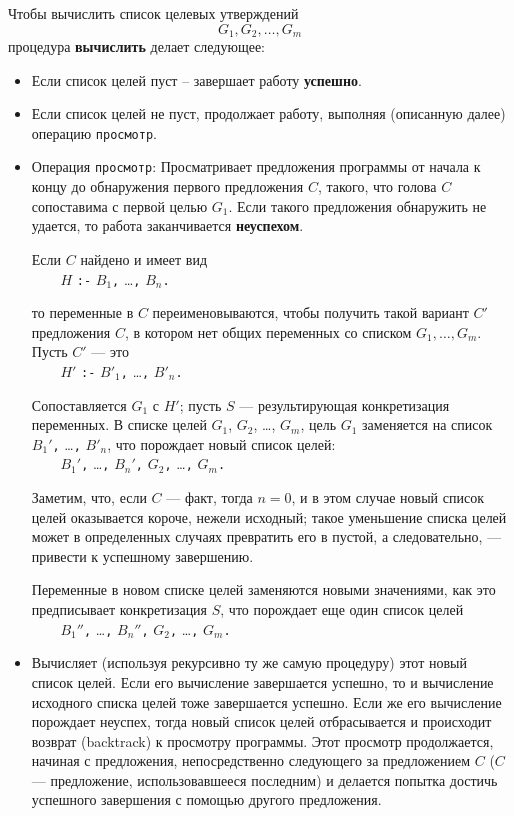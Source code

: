 \documentclass[12pt, openany, twoside]{book} %
\begin{document}
Чтобы вычислить список целевых утверждений
$$
    G_1, G_2, \ldots, G_m
$$
процедура \textbf{вычислить} делает следующее:
\begin{itemize}
  \item Если список целей пуст -- завершает работу \textbf{успешно}.
  \item Если список целей не пуст, продолжает работу, выполняя (описанную далее) операцию {\tt просмотр}.
  \item Операция \texttt{просмотр}: Просматривает предложения программы от начала к концу до обнаружения первого предложения $C$, такого, что голова $C$ сопоставима с первой целью $G_1$. Если такого предложения обнаружить не удается, то работа заканчивается \textbf{неуспехом}.

\noindent Если $C$ найдено и имеет вид\\[1ex]
\verb|    |$H$ {\tt :-} $B_1${\tt,} \ldots{\tt,} $B_n${\tt.}

\noindent то переменные в $C$ переименовываются, чтобы получить такой вариант $C'$ предложения $C$, в котором нет общих переменных со списком $G_1, \ldots, G_m$. Пусть $C'$ --- это\\[1ex]
\verb|    |$H'$ {\tt :-} $B'_1${\tt,} \ldots{\tt,} $B'_n${\tt.}

\noindent Сопоставляется $G_1$ с $H'$; пусть $S$ --- результирующая конкретизация переменных. В списке целей $G_1$, $G_2$, \ldots, $G_m$, цель $G_1$ заменяется на список $B_1'${\tt,} \ldots{\tt,} $B'_n$, что порождает новый список
целей:\\[1ex]
\verb|    |$B_1'${\tt ,} \ldots{\tt,} $B_n'${\tt,} $G_2${\tt,}
    \ldots{\tt,} $G_m${\tt.}

\noindent Заметим, что, если $C$ --- факт, тогда $n = 0$, и в этом случае
новый список целей оказывается короче, нежели исходный; такое уменьшение списка целей может в определенных случаях превратить его в пустой, а следовательно, --- привести к успешному завершению.

\noindent Переменные в новом списке целей заменяются новыми значениями, как
это предписывает конкретизация $S$, что порождает еще один список целей\\[1ex]
\verb|    |$B_1''${\tt ,} \ldots{\tt,} $B_n''${\tt,} $G_2${\tt,}
    \ldots{\tt,} $G_m${\tt.}

  \item Вычисляет (используя рекурсивно ту же самую процедуру) этот новый список целей. Если его вычисление завершается успешно, то и вычисление исходного списка целей тоже завершается успешно. Если же его вычисление порождает неуспех, тогда новый список целей отбрасывается и происходит возврат (backtrack) к просмотру программы. Этот просмотр продолжается, начиная с предложения, непосредственно следующего за предложением $C$ ($C$ --- предложение, использовавшееся последним) и делается попытка достичь успешного завершения с помощью другого предложения.
\end{itemize}
\end{document}
